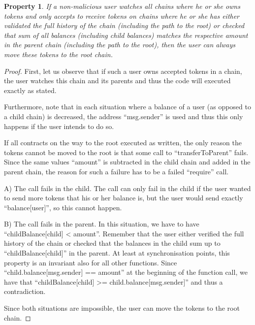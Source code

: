 \documentclass[11pt,letterpaper]{article}
\newtheorem{property}[dummytheorem]{Property}
\begin{document}
\begin{property}
If a non-malicious user watches all chains where he or she owns tokens and only accepts to receive
tokens on chains where he or she has either validated the full history of the chain
(including the path to the root) or
checked that sum of all balances (including child balances) matches the respective amount in the parent chain
(including the path to the root), then the user
can always move these tokens to the root chain.
\end{property}
\begin{proof}
First, let us observe that if such a user owns accepted tokens in a chain, the user
watches this chain and its parents and thus the code will executed exactly as stated.

Furthermore, note that in each situation where a balance of a user (as opposed
to a child chain) is decreased, the address ``msg.sender'' is used and thus
this only happens if the user intends to do so.

If all contracts on the way to the root executed as written,
the only reason the tokens cannot be moved to the root
is that some call to ``transferToParent'' fails. Since the same values
``amount'' is subtracted in the child chain and added in the parent chain,
the reason for such a failure has to be a failed ``require'' call.

A) The call fails in the child. The call can only fail in the child if the
user wanted to send more tokens that his or her balance is, but the user
would send exactly ``balance[user]'', so this cannot happen.

B) The call fails in the parent. In this situation, we have to have
``childBalance[child] < amount''. Remember that the user either verified
the full history of the chain or checked that the balances in the
child sum up to ``childBalance[child]'' in the parent. At least at synchronisation
points, this property is an invariant also for all other functions.
Since ``child.balance[msg.sender] == amount'' at the beginning of the
function call, we have that ``childBalance[child] >= child.balance[msg.sender]''
and thus a contradiction.

Since both situations are impossible, the user can move the tokens
to the root chain.
\end{proof}



\end{document}
